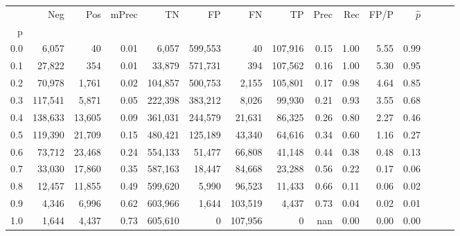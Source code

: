 \begin{tabular}{rrrrrrrrrrrrrrr}
\toprule
{} &      Neg &     Pos & mPrec &       TN &       FP &       FN &       TP &  Prec &   Rec &  FP/P & $\hat{p}$ \\
p   &          &         &       &          &          &          &          &       &       &       &           \\
\midrule
0.0 &    6,057 &      40 &  0.01 &    6,057 &  599,553 &       40 &  107,916 &  0.15 &  1.00 &  5.55 &      0.99 \\
0.1 &   27,822 &     354 &  0.01 &   33,879 &  571,731 &      394 &  107,562 &  0.16 &  1.00 &  5.30 &      0.95 \\
0.2 &   70,978 &   1,761 &  0.02 &  104,857 &  500,753 &    2,155 &  105,801 &  0.17 &  0.98 &  4.64 &      0.85 \\
0.3 &  117,541 &   5,871 &  0.05 &  222,398 &  383,212 &    8,026 &   99,930 &  0.21 &  0.93 &  3.55 &      0.68 \\
0.4 &  138,633 &  13,605 &  0.09 &  361,031 &  244,579 &   21,631 &   86,325 &  0.26 &  0.80 &  2.27 &      0.46 \\
0.5 &  119,390 &  21,709 &  0.15 &  480,421 &  125,189 &   43,340 &   64,616 &  0.34 &  0.60 &  1.16 &      0.27 \\
0.6 &   73,712 &  23,468 &  0.24 &  554,133 &   51,477 &   66,808 &   41,148 &  0.44 &  0.38 &  0.48 &      0.13 \\
0.7 &   33,030 &  17,860 &  0.35 &  587,163 &   18,447 &   84,668 &   23,288 &  0.56 &  0.22 &  0.17 &      0.06 \\
0.8 &   12,457 &  11,855 &  0.49 &  599,620 &    5,990 &   96,523 &   11,433 &  0.66 &  0.11 &  0.06 &      0.02 \\
0.9 &    4,346 &   6,996 &  0.62 &  603,966 &    1,644 &  103,519 &    4,437 &  0.73 &  0.04 &  0.02 &      0.01 \\
1.0 &    1,644 &   4,437 &  0.73 &  605,610 &        0 &  107,956 &        0 &   nan &  0.00 &  0.00 &      0.00 \\
\bottomrule
\end{tabular}
